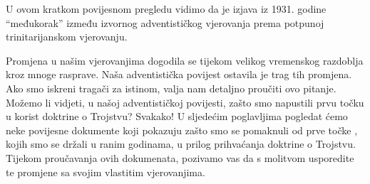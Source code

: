 U ovom kratkom povijesnom pregledu vidimo da je izjava iz 1931. godine “međukorak” između izvornog adventističkog vjerovanja prema potpunoj trinitarijanskom vjerovanju.

Promjena u našim vjerovanjima dogodila se tijekom velikog vremenskog razdoblja kroz mnoge rasprave. Naša adventistička povijest ostavila je trag tih promjena. Ako smo iskreni tragači za istinom, valja nam detaljno proučiti ovo pitanje. Možemo li vidjeti, u našoj adventističkoj povijesti, zašto smo napustili prvu točku  u korist doktrine o Trojstvu? Svakako! U sljedećim poglavljima pogledat ćemo neke povijesne dokumente koji pokazuju zašto smo se pomaknuli od prve točke , kojih smo se držali u ranim godinama, u prilog prihvaćanja doktrine o Trojstvu. Tijekom proučavanja ovih dokumenata, pozivamo vas da s molitvom usporedite te promjene sa svojim vlastitim vjerovanjima.

